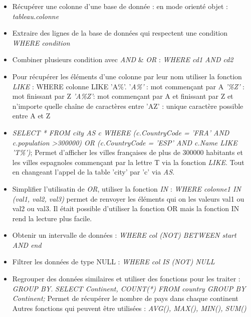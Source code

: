\documentclass[12pt,a4paper]{article}
\begin{document}
\begin{itemize}
\item Récupérer une colonne d'une base de donnée : en mode orienté objet : \textit{tableau.colonne}
\item Extraire des lignes de la base de données qui respectent une condition \textit{WHERE condition}
\item Combiner plusieurs condition avec \textit{AND} \& \textit{OR} : \textit{WHERE cd1 AND cd2}
\item Pour récupérer les éléments d'une colonne par leur nom utiliser la fonction \textit{LIKE} : WHERE colonne LIKE 'A\%'.
\newline '\textit{A\%'} : mot commençant par A
\newline \textit{'\%Z'} : mot finissant par Z
\newline \textit{'A\%Z'}: mot commençant par A et finissant par Z et n'importe quelle chaîne de caractères entre
\newline 'A\textunderscore Z' : unique caractère possible entre A et Z
\item \textit{SELECT * FROM city AS c WHERE (c.CountryCode = 'FRA' AND c.population \textgreater 300000) OR (c.CountryCode = 'ESP' AND c.Name LIKE 'T\%')};
\newline Permet d'afficher les villes françaises de plus de 300000 habitants et les villes espagnoles commençant par la lettre T via la fonction \textit{LIKE}. Tout en changeant l'appel de la table 'city' par 'c' via \textit{AS}.
\item Simplifier l'utilisatin de \textit{OR}, utiliser la fonction \textit{IN} :
\newline \textit{WHERE colonne1 IN (val1, val2, val3)} permet de renvoyer les éléments qui on les valeurs val1 ou val2 ou val3.
\newline Il était possible d'utiliser la fonction OR mais la fonction IN rend la lecture plus facile.
\item Obtenir un intervalle de données : \textit{WHERE col (NOT) BETWEEN start AND end}
\item Filtrer les données de type NULL : \textit{WHERE col IS (NOT) NULL}
\item Regrouper des données similaires et utiliser des fonctions pour les traiter : \textit{GROUP BY}.
\newline \textit{SELECT Continent, COUNT(*)  FROM country GROUP BY Continent;} 
\newline Permet de récupérer le nombre de pays dans chaque continent
\newline Autres fonctions qui peuvent être utilisées : \textit{AVG(), MAX(), MIN(), SUM()}

\end{itemize}
\end{document}
